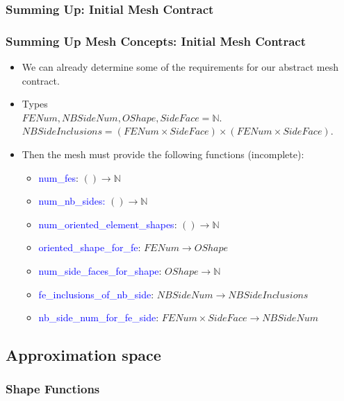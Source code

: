 \documentclass[compress]{beamer}
\begin{document}
\subsubsection{Summing Up: Initial Mesh Contract}

\begin{frame}
  \frametitle{Summing Up Mesh Concepts: Initial Mesh Contract}
  \begin{itemize}[<+->]
    \item We can already determine some of the requirements for our abstract mesh contract.
    \item Types \\
      $FENum, NBSideNum, OShape, SideFace = \mathbb{N}$.\\
      $NBSideInclusions = (FENum \times SideFace) \times (FENum \times SideFace)$.
    \item Then the mesh must provide the following functions (incomplete):
      \begin{itemize}[<+->]
        \item \textcolor{blue}{num\_fes}: $() \rightarrow \mathbb{N}$
        \item \textcolor{blue}{num\_nb\_sides:} $() \rightarrow \mathbb{N}$
        \item \textcolor{blue}{num\_oriented\_element\_shapes}: $() \rightarrow \mathbb{N}$
        \item \textcolor{blue}{oriented\_shape\_for\_fe}:  $FENum \rightarrow OShape$
        \item \textcolor{blue}{num\_side\_faces\_for\_shape}: $OShape \rightarrow \mathbb{N}$
        \item \textcolor{blue}{fe\_inclusions\_of\_nb\_side}: $NBSideNum \rightarrow NBSideInclusions $
        \item \textcolor{blue}{nb\_side\_num\_for\_fe\_side}: $FENum \times SideFace \rightarrow NBSideNum$
      \end{itemize}
  \end{itemize}
\end{frame}

\subsection{Approximation space}

\subsubsection{Shape Functions}
\end{document}
